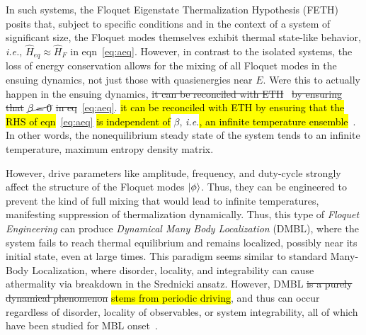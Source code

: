\documentclass[%
reprint,
superscriptaddress,
linenumbers,
amsmath,amssymb,
aps,
prb,
showkeys,
]{revtex4-2}
\begin{document}
In such systems, the Floquet Eigenstate Thermalization Hypothesis (FETH) posits that, subject to specific conditions and in the context of a system of significant size, the Floquet modes themselves exhibit thermal state-like behavior, \textit{i.e.}, $\hat{H}_{eq}\approx \hat{H}_F$ in eqn~\ref{eq:aeq}. However, in contrast to the isolated systems, the loss of energy conservation allows for the mixing of all Floquet modes in the ensuing dynamics, not just those with quasienergies near $E$. Were this to actually happen in the ensuing dynamics, \st{it can be reconciled with ETH}~\cite{alessio} \st{by ensuring that} $\cancel{\beta=0}$ \st{in eq}~\ref{eq:aeq}. 
\hl{it can be reconciled with ETH by ensuring that the RHS of eqn}~\ref{eq:aeq} \hl{is independent of} $\beta$, \textit{i.e.}\hl{, an infinite temperature ensemble}~\cite{alessio}. In other words, the nonequilibrium steady state of the system tends to an infinite temperature, maximum entropy density matrix.

However, drive parameters like amplitude, frequency, and duty-cycle strongly affect the structure of the Floquet modes $\ket{\phi}$. Thus, they can be engineered to prevent the kind of full mixing that would lead to infinite temperatures, manifesting suppression of thermalization dynamically. Thus, this type of \textit{Floquet Engineering} can produce \textit{Dynamical Many Body Localization} (DMBL), where the system fails to reach thermal equilibrium and remains localized, possibly  near its initial state, even at large times. This paradigm seems similar to standard Many-Body Localization\cite{yousefjani2023, sierant_2023}, where disorder, locality, and integrability can cause athermality via breakdown in the Srednicki ansatz. However, DMBL \st{is a purely dynamical phenomenon} \hl{stems from periodic driving}, and thus can occur regardless of disorder, locality of observables, or system integrability, all of which have been studied for MBL onset~\cite{Sougata2023,Fabien2018,garratt_resonant_2022}.
\end{document}
